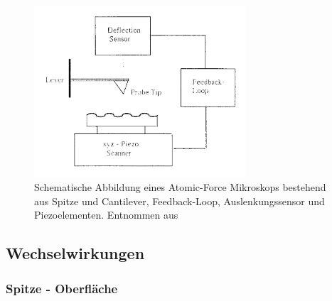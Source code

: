         \begin{figure}[h]
          \centering
          \includegraphics[width = 0.7\textwidth]{pictures/prinzip.png}
          \caption{Schematische Abbildung eines Atomic-Force Mikroskops bestehend aus Spitze und Cantilever, Feedback-Loop, Auslenkungssensor und Piezoelementen. Entnommen aus \cite{meyer_atomic_1992}}
          \label{fig:prinzip}
        \end{figure}
    
        \FloatBarrier


      \subsection{Wechselwirkungen}

        \subsubsection{Spitze - Oberfläche}

